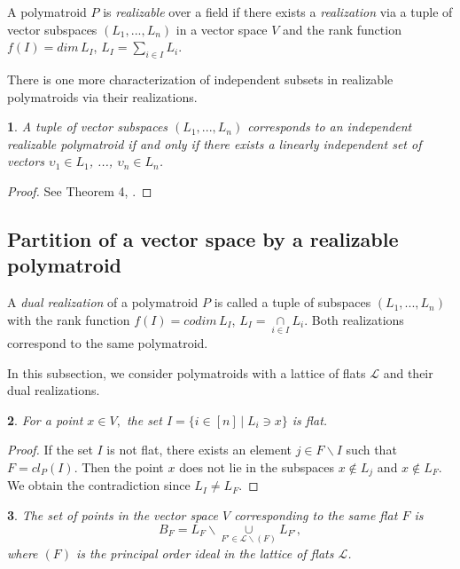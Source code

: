 \documentclass[11pt]{article}
\theoremstyle{plain}
\newtheorem{thm}{\protect\theoremname}[section]
\theoremstyle{definition}
\theoremstyle{remark}
\theoremstyle{plain}
\newtheorem{lem}[thm]{\protect\lemmaname}
\theoremstyle{plain}
\theoremstyle{plain}
\theoremstyle{definition}
\providecommand{\lemmaname}{Lemma}
\providecommand{\theoremname}{Theorem}
\begin{document}
A polymatroid $P$ is \textit{realizable} over a field if there exists
a \textit{realization} via a tuple of vector subspaces $(L_{1},...,L_{n})$
in a vector space $V$ and the rank function $f(I)=dim\,L_{I}$, $L_{I}=\underset{i\in I}{\sum}L_{i}$. 

There is one more characterization of independent subsets in realizable
polymatroids via their realizations.
\begin{thm}
A tuple of vector subspaces $(L_{1},...,L_{n})$ corresponds to an
independent realizable polymatroid if and only if there exists a linearly
independent set of vectors $\upsilon_{1}\in L_{1}$, ..., $\upsilon_{n}\in L_{n}$.
\end{thm}

\begin{proof}
See Theorem 4, \cite{khovanskii_newton_2016}.
\end{proof}

\subsection{Partition of a vector space by a realizable polymatroid}

A \textit{dual realization }of a polymatroid $P$ is called a tuple
of subspaces $(L_{1},...,L_{n})$ with the rank function $f(I)=codim\,L_{I}$,
$L_{I}=\underset{i\in I}{\cap}L_{i}$. Both realizations correspond
to the same polymatroid.

In this subsection, we consider polymatroids with a lattice of flats
$\mathcal{L}$ and their dual realizations.
\begin{lem}
\label{Lemma. For a point x, I is flat}For a point $x\in V,$ the
set $I=\{i\in[n]\,|\;L_{i}\ni x\}$ is flat.
\end{lem}

\begin{proof}
If the set $I$ is not flat, there exists an element $j\in F\backslash I$
such that $F=cl_{P}(I).$ Then the point $x$ does not lie in the
subspaces $x\notin L_{j}$ and $x\notin L_{F}$. We obtain the contradiction
since $L_{I}\neq L_{F}$.
\end{proof}
\begin{lem}
\label{Lemma. B_F}The set of points in the vector space $V$ corresponding
to the same flat $F$ is
\[
B_{F}=L_{F}\backslash\underset{F'\in\mathcal{L}\backslash(F)}{\cup}L_{F'},
\]
where $(F)$ is the principal order ideal in the lattice of flats
$\mathcal{L}$.
\end{lem}
\end{document}
